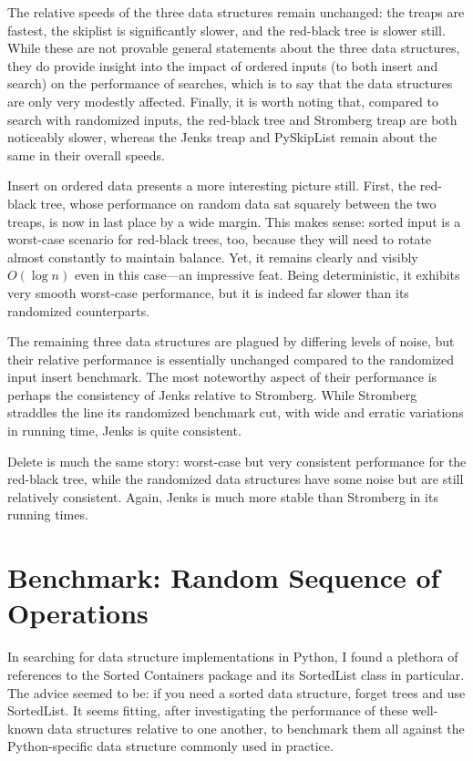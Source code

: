 \documentclass{article}
\begin{document}
The relative speeds of the three data structures remain unchanged: the treaps are fastest, the skiplist is significantly slower, and the red-black tree is slower still. While these are not provable general statements about the three data structures, they do provide insight into the impact of ordered inputs (to both insert and search) on the performance of searches, which is to say that the data structures are only very modestly affected. Finally, it is worth noting that, compared to search with randomized inputs, the red-black tree and Stromberg treap are both noticeably slower, whereas the Jenks treap and PySkipList remain about the same in their overall speeds.



Insert on ordered data presents a more interesting picture still. First, the red-black tree, whose performance on random data sat squarely between the two treaps, is now in last place by a wide margin. This makes sense: sorted input is a worst-case scenario for red-black trees, too, because they will need to rotate almost constantly to maintain balance. Yet, it remains clearly and visibly $O(\log n)$ even in this case---an impressive feat. Being deterministic, it exhibits very smooth worst-case performance, but it is indeed far slower than its randomized counterparts.

The remaining three data structures are plagued by differing levels of noise, but their relative performance is essentially unchanged compared to the randomized input insert benchmark. The most noteworthy aspect of their performance is perhaps the consistency of Jenks relative to Stromberg. While Stromberg straddles the line its randomized benchmark cut, with wide and erratic variations in running time, Jenks is quite consistent.



Delete is much the same story: worst-case but very consistent performance for the red-black tree, while the randomized data structures have some noise but are still relatively consistent. Again, Jenks is much more stable than Stromberg in its running times.

\section{Benchmark: Random Sequence of Operations}

In searching for data structure implementations in Python, I found a plethora of references to the Sorted Containers package and its SortedList class in particular. The advice seemed to be: if you need a sorted data structure, forget trees and use SortedList. It seems fitting, after investigating the performance of these well-known data structures relative to one another, to benchmark them all against the Python-specific data structure commonly used in practice. 
\end{document}
